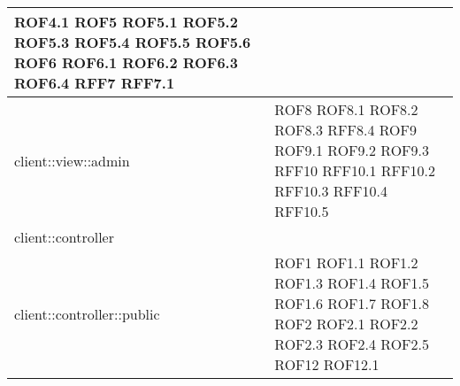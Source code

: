 \begin{center}
\begin{longtable}{| p{9cm} | p{4cm} |}
\newline ROF4.1 \newline ROF5 \newline ROF5.1 \newline ROF5.2 \newline ROF5.3 \newline ROF5.4
\newline ROF5.5  \newline ROF5.6 \newline ROF6 \newline ROF6.1 \newline ROF6.2 \newline ROF6.3 \newline ROF6.4 \newline RFF7 \newline RFF7.1 \\
\hline
client::view::admin  &  ROF8 \newline ROF8.1 \newline ROF8.2 \newline ROF8.3 \newline RFF8.4
\newline ROF9 \newline ROF9.1 \newline ROF9.2 \newline ROF9.3 \newline RFF10 \newline RFF10.1
\newline RFF10.2 \newline RFF10.3 \newline RFF10.4 \newline RFF10.5 \\
\hline
client::controller  &  \\
\hline
client::controller::public  &  ROF1 \newline ROF1.1 \newline ROF1.2 \newline ROF1.3 \newline ROF1.4
\newline ROF1.5 \newline ROF1.6 \newline ROF1.7 \newline ROF1.8 \newline ROF2 \newline ROF2.1
\newline ROF2.2 \newline ROF2.3 \newline ROF2.4 \newline ROF2.5 \newline ROF12 \newline ROF12.1

\end{longtable}
\end{center}
